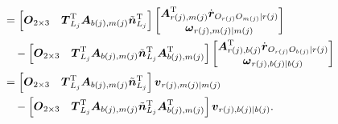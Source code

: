 \begin{align}
  &= \begin{bmatrix} \boldsymbol{O}_{2\times 3} & \boldsymbol{T}_{L_j}^{\mathrm{T}} \boldsymbol{A}_{b(j),m(j)} \tilde{\boldsymbol{n}}_{L_j}^{\mathrm{T}} \end{bmatrix}
  \begin{bmatrix} \boldsymbol{A}_{r(j),m(j)}^{\mathrm{T}} \dot{\boldsymbol{r}}_{O_{r(j)} O_{m(j)} \mid r(j)} \\ \boldsymbol{\omega}_{r(j),m(j) \mid m(j)} \end{bmatrix} \notag \\
  &\quad - \begin{bmatrix} \boldsymbol{O}_{2\times 3} & \boldsymbol{T}_{L_j}^{\mathrm{T}} \boldsymbol{A}_{b(j),m(j)} \tilde{\boldsymbol{n}}_{L_j}^{\mathrm{T}} \boldsymbol{A}_{b(j),m(j)}^{\mathrm{T}} \end{bmatrix}
  \begin{bmatrix} \boldsymbol{A}_{r(j),b(j)}^{\mathrm{T}} \dot{\boldsymbol{r}}_{O_{r(j)} O_{b(j)} \mid r(j)} \\ \boldsymbol{\omega}_{r(j),b(j) \mid b(j)} \end{bmatrix} \notag \\
  &= \begin{bmatrix} \boldsymbol{O}_{2\times 3} & \boldsymbol{T}_{L_j}^{\mathrm{T}} \boldsymbol{A}_{b(j),m(j)} \tilde{\boldsymbol{n}}_{L_j}^{\mathrm{T}} \end{bmatrix} \boldsymbol{v}_{r(j),m(j) \mid m(j)} \notag \\
  &\quad - \begin{bmatrix} \boldsymbol{O}_{2\times 3} & \boldsymbol{T}_{L_j}^{\mathrm{T}} \boldsymbol{A}_{b(j),m(j)} \tilde{\boldsymbol{n}}_{L_j}^{\mathrm{T}} \boldsymbol{A}_{b(j),m(j)}^{\mathrm{T}} \end{bmatrix} \boldsymbol{v}_{r(j),b(j) \mid b(j)}. \label{eq:10.57b}
\end{align}

